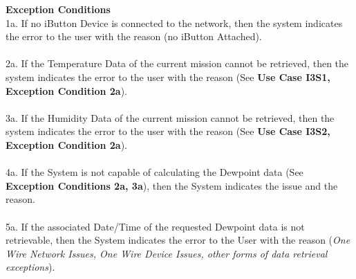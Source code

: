 \documentclass[letterpaper]{article}
\begin{document}
\textbf{Exception Conditions}\\
1a.  If no iButton Device is connected to the network, then the system
indicates the error to the user with the reason (no iButton Attached).
\\\\
2a.  If the Temperature Data of the current mission cannot be
retrieved,
then the system indicates the error to the user with the reason (See
\textbf{Use Case I3S1, Exception Condition 2a}).\\\\
3a.  If the Humidity Data of the current mission cannot be retrieved,
then the system indicates the error to the user with the reason (See
\textbf{Use Case I3S2, Exception Condition 2a}).\\\\
4a.  If the System is not capable of calculating the Dewpoint data
(See \textbf{Exception Conditions 2a, 3a}), then the System
indicates the issue and the reason.\\\\
5a.  If the associated Date/Time of the requested Dewpoint data
is not retrievable, then the System indicates the error to the User
with the reason (\textit{One Wire Network Issues, One Wire Device
Issues, other forms of data retrieval exceptions}).
\end{document}

